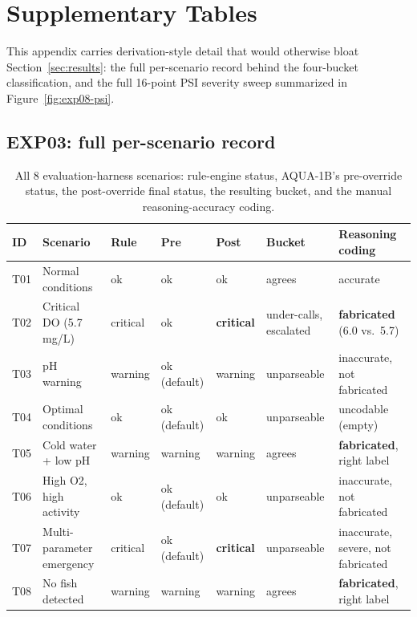 \appendix
\section{Supplementary Tables}
\label{sec:appendix}

This appendix carries derivation-style detail that would otherwise bloat
Section~\ref{sec:results}: the full per-scenario record behind the four-bucket classification, and
the full 16-point PSI severity sweep summarized in Figure~\ref{fig:exp08-psi}.

\subsection{EXP03: full per-scenario record}

\begin{table}[h]
\centering
\footnotesize
\caption{All 8 evaluation-harness scenarios: rule-engine status, AQUA-1B's pre-override status,
the post-override final status, the resulting bucket, and the manual reasoning-accuracy coding.}
\label{tab:exp03-full}
\begin{tabular}{@{}lp{2.6cm}lllp{2.4cm}p{2.9cm}@{}}
\toprule
ID & Scenario & Rule & Pre & Post & Bucket & Reasoning coding \\
\midrule
T01 & Normal conditions & ok & ok & ok & agrees & accurate \\
T02 & Critical DO (5.7 mg/L) & critical & ok & \textbf{critical} & under-calls, escalated & \textbf{fabricated} (6.0 vs.\ 5.7) \\
T03 & pH warning & warning & ok (default) & warning & unparseable & inaccurate, not fabricated \\
T04 & Optimal conditions & ok & ok (default) & ok & unparseable & uncodable (empty) \\
T05 & Cold water + low pH & warning & warning & warning & agrees & \textbf{fabricated}, right label \\
T06 & High O2, high activity & ok & ok (default) & ok & unparseable & inaccurate, not fabricated \\
T07 & Multi-parameter emergency & critical & ok (default) & \textbf{critical} & unparseable & inaccurate, severe, not fabricated \\
T08 & No fish detected & warning & warning & warning & agrees & \textbf{fabricated}, right label \\
\bottomrule
\end{tabular}
\end{table}

